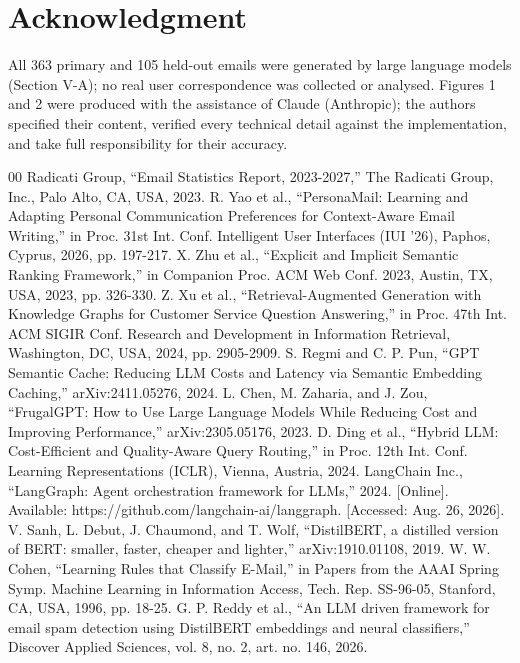 \documentclass[conference]{IEEEtran}
\begin{document}
\section*{Acknowledgment}
All 363 primary and 105 held-out emails were generated by large language models (Section V-A); no real user correspondence was collected or analysed. Figures 1 and 2 were produced with the assistance of Claude (Anthropic); the authors specified their content, verified every technical detail against the implementation, and take full responsibility for their accuracy.

\balance
\begin{thebibliography}{00}
\footnotesize
{} Radicati Group, ``Email Statistics Report, 2023-2027,'' The Radicati Group, Inc., Palo Alto, CA, USA, 2023.
 R. Yao et al., ``PersonaMail: Learning and Adapting Personal Communication Preferences for Context-Aware Email Writing,'' in Proc. 31st Int. Conf. Intelligent User Interfaces (IUI '26), Paphos, Cyprus, 2026, pp. 197-217.
 X. Zhu et al., ``Explicit and Implicit Semantic Ranking Framework,'' in Companion Proc. ACM Web Conf. 2023, Austin, TX, USA, 2023, pp. 326-330.
 Z. Xu et al., ``Retrieval-Augmented Generation with Knowledge Graphs for Customer Service Question Answering,'' in Proc. 47th Int. ACM SIGIR Conf. Research and Development in Information Retrieval, Washington, DC, USA, 2024, pp. 2905-2909.
 S. Regmi and C. P. Pun, ``GPT Semantic Cache: Reducing LLM Costs and Latency via Semantic Embedding Caching,'' arXiv:2411.05276, 2024.
 L. Chen, M. Zaharia, and J. Zou, ``FrugalGPT: How to Use Large Language Models While Reducing Cost and Improving Performance,'' arXiv:2305.05176, 2023.
 D. Ding et al., ``Hybrid LLM: Cost-Efficient and Quality-Aware Query Routing,'' in Proc. 12th Int. Conf. Learning Representations (ICLR), Vienna, Austria, 2024.
 LangChain Inc., ``LangGraph: Agent orchestration framework for LLMs,'' 2024. [Online]. Available: https://github.com/langchain-ai/langgraph. [Accessed: Aug. 26, 2026].
 V. Sanh, L. Debut, J. Chaumond, and T. Wolf, ``DistilBERT, a distilled version of BERT: smaller, faster, cheaper and lighter,'' arXiv:1910.01108, 2019.
 W. W. Cohen, ``Learning Rules that Classify E-Mail,'' in Papers from the AAAI Spring Symp. Machine Learning in Information Access, Tech. Rep. SS-96-05, Stanford, CA, USA, 1996, pp. 18-25.
 G. P. Reddy et al., ``An LLM driven framework for email spam detection using DistilBERT embeddings and neural classifiers,'' Discover Applied Sciences, vol. 8, no. 2, art. no. 146, 2026.

\end{thebibliography}
\end{document}
